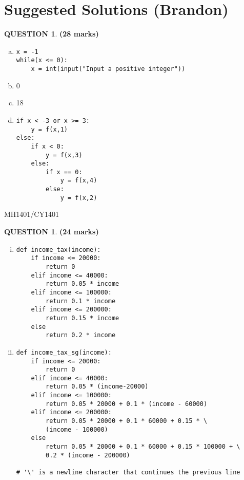 \documentclass[a4paper,12pt]{article}
\theoremstyle{definition}
\newtheorem{ques}[dummy]{QUESTION}
\theoremstyle{plain}
\newcommand{\py}{python}
\begin{document}
\section*{Suggested Solutions (Brandon)}
\begin{ques}\hfill\textbf{(28 marks)}\\
	\begin{enumerate}[(a)]
		\item 
		\begin{verbatim}
x = -1
while(x <= 0):
    x = int(input("Input a positive integer"))
		\end{verbatim}
		\item 0
		\item 18
		\item 
\begin{verbatim}
if x < -3 or x >= 3:
    y = f(x,1)
else:
    if x < 0:
        y = f(x,3)
    else:
        if x == 0:
            y = f(x,4)
        else:
            y = f(x,2)
\end{verbatim}
	\end{enumerate}
\end{ques}

\newpage
\hfill MH1401/CY1401\vspace*{0.5em}
\begin{ques}\hfill \textbf{(24 marks)}\\
	\begin{enumerate}[(i)]
		\item 
		\begin{verbatim}
def income_tax(income):
    if income <= 20000:
        return 0
    elif income <= 40000:
        return 0.05 * income
    elif income <= 100000:
        return 0.1 * income
    elif income <= 200000:
        return 0.15 * income
    else
        return 0.2 * income
		\end{verbatim}
		
		
		\item 
		\begin{verbatim}
def income_tax_sg(income):
    if income <= 20000:
        return 0
    elif income <= 40000:
        return 0.05 * (income-20000)
    elif income <= 100000:
        return 0.05 * 20000 + 0.1 * (income - 60000)
    elif income <= 200000:
        return 0.05 * 20000 + 0.1 * 60000 + 0.15 * \
        (income - 100000)
    else
        return 0.05 * 20000 + 0.1 * 60000 + 0.15 * 100000 + \ 
        0.2 * (income - 200000)

# '\' is a newline character that continues the previous line
		\end{verbatim}
	\end{enumerate}
\end{ques}
\end{document}
